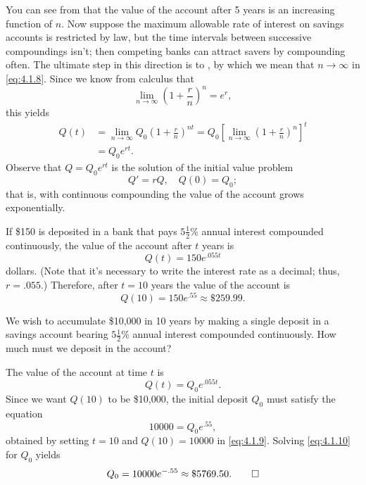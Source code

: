 You can see from  that the value of the account after 5
years is an increasing function of $n$. Now suppose  the maximum
allowable rate of interest on savings accounts is restricted by law,
but the time intervals between successive compoundings isn't; then
competing banks can attract savers by compounding often. The ultimate
step in this direction is to , by which we
mean that $n\to\infty$ in \eqref{eq:4.1.8}. Since we know from calculus
that
\[
\lim_{n\to\infty} \left(1+\frac{r}{n}\right)^n=e^r,
\]
 this yields
\begin{align*}
Q(t) & =\lim_{n\to\infty} Q_0\left(1+\frac{r}{n}\right)^{nt}
=Q_0 \left[\lim_{n\to\infty} \left(1+\frac{r}{n}\right)^n\right]^t \\
&=Q_0e^{rt}.
\end{align*}
Observe that $Q=Q_0e^{rt}$ is the solution of the initial value problem
\[
Q'=rQ, \quad Q(0)=Q_0;
\]
 that is, with continuous compounding the value of the account
grows exponentially.

\begin{example}\label{example:4.1.2}
If \$150 is deposited in a bank that pays
$5\frac{1}{2}$\% annual
interest compounded continuously, the value of the account after
$t$ years is
\[
Q(t)=150e^{.055t}
\]
dollars. (Note that it's necessary to write the interest rate as a
decimal;   thus, $r=.055$.) Therefore, after $t=10$ years the value
of the account is
\[
Q(10)=150e^{.55} \approx \$259.99.
\]
\end{example}

\begin{example}\label{example:4.1.3}
We wish to accumulate \$10,000 in 10 years by making a single deposit
in a savings account bearing $5\frac{1}{2}$\% annual interest
compounded continuously. How much must we deposit in the account?
\end{example}

\begin{solution}
The value of the account at time $t$ is
\begin{equation} \label{eq:4.1.9}
Q(t)=Q_0e^{.055t}.
\end{equation}
Since we want $Q(10)$ to be \$10,000, the initial deposit $Q_0$ must
satisfy the equation
\begin{equation} \label{eq:4.1.10}
10000=Q_0e^{.55},
\end{equation}
 obtained by setting $t=10$ and $Q(10)=10000$ in
\eqref{eq:4.1.9}.  Solving \eqref{eq:4.1.10} for $Q_0$ yields
\[
Q_0=10000e^{-.55} \approx \$5769.50.\qedhere
\]
\end{solution}


